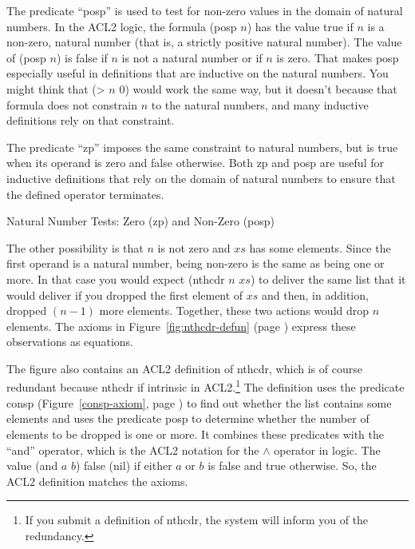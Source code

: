 \begin{aside}
The predicate ``posp'' is used to test for non-zero values
in the domain of natural numbers.
In the ACL2 logic, the formula (posp $n$) has the value true if $n$ is
a non-zero, natural number (that is, a strictly positive natural number).
The value of (posp $n$) is false if $n$ is not a natural number
or if $n$ is zero.
That makes posp especially useful
in definitions that are inductive on the natural numbers.
You might think that (> $n$ 0) would
work the same way, but it doesn't because that formula
does not constrain $n$ to the natural numbers,
and many inductive definitions rely on that constraint.

The predicate ``zp'' imposes the same constraint to natural numbers,
but is true when its operand is zero and false otherwise.
Both zp and posp are useful for inductive definitions that
rely on the domain of natural numbers to ensure that the
defined operator terminates.
\caption{Natural Number Tests: Zero (zp) and Non-Zero (posp)}
\label{zp-def}
\end{aside}

The other possibility is that $n$ is not zero and $xs$ has some elements.
Since the first operand is a natural number,
being non-zero is the same as being one or more.
In that case you would expect (nthcdr $n$ $xs$) to deliver
the same list that it would deliver
if you dropped the first element of $xs$
and then, in addition, dropped $(n - 1)$ more elements.
Together, these two actions would drop $n$ elements.
The axioms in Figure~\ref{fig:nthcdr-defun} (page \pageref{fig:nthcdr-defun})
express these observations as equations.

The figure also contains an ACL2 definition of nthcdr, which
is of course redundant because nthcdr if intrinsic in ACL2.\footnote{If
you submit a definition of nthcdr,
the system will inform you of the redundancy.}
The definition uses the predicate consp
(Figure~\ref{consp-axiom}, page \pageref{consp-axiom})
to find out whether the list contains some elements and
uses the predicate
\label{posp-def} posp
to determine whether
the number of elements to be dropped is one or more.
It combines these predicates with the ``and'' operator,
which is the ACL2 notation for the $\wedge$ operator in logic.
\label{and-op=informal}
The value (and $a$ $b$) false (nil)
if either $a$ or $b$ is false and true otherwise.
So, the ACL2 definition matches the axioms.

